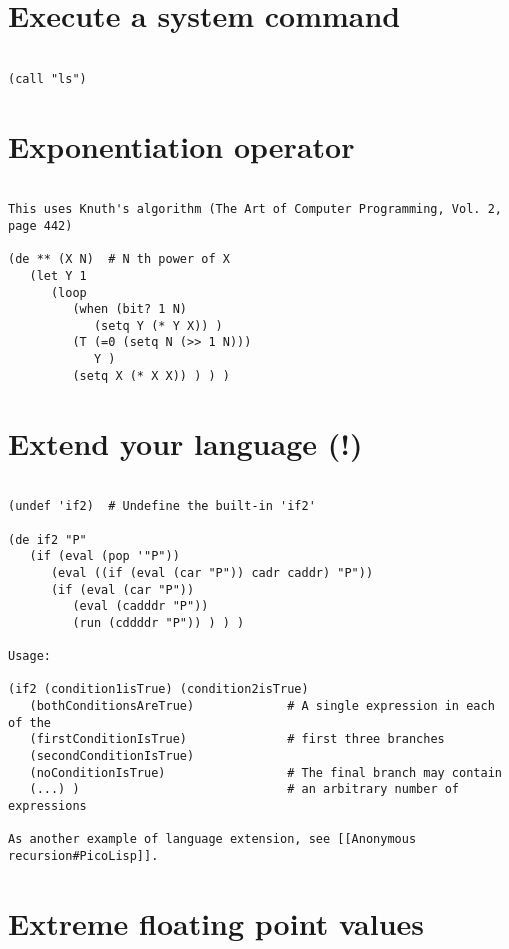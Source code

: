 \section*{Execute a system command}

\begin{verbatim}

(call "ls")

\end{verbatim}

\section*{Exponentiation operator}

\begin{verbatim}

This uses Knuth's algorithm (The Art of Computer Programming, Vol. 2, page 442)

(de ** (X N)  # N th power of X
   (let Y 1
      (loop
         (when (bit? 1 N)
            (setq Y (* Y X)) )
         (T (=0 (setq N (>> 1 N)))
            Y )
         (setq X (* X X)) ) ) )

\end{verbatim}

\section*{Extend your language (!)}

\begin{verbatim}

(undef 'if2)  # Undefine the built-in 'if2'

(de if2 "P"
   (if (eval (pop '"P"))
      (eval ((if (eval (car "P")) cadr caddr) "P"))
      (if (eval (car "P"))
         (eval (cadddr "P"))
         (run (cddddr "P")) ) ) )

Usage:

(if2 (condition1isTrue) (condition2isTrue)
   (bothConditionsAreTrue)             # A single expression in each of the
   (firstConditionIsTrue)              # first three branches
   (secondConditionIsTrue)
   (noConditionIsTrue)                 # The final branch may contain
   (...) )                             # an arbitrary number of expressions

As another example of language extension, see [[Anonymous recursion#PicoLisp]].

\end{verbatim}

\section*{Extreme floating point values}

